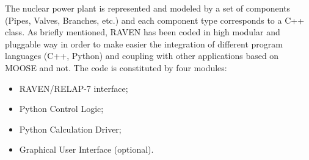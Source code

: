 \documentclass{mc2013}
\begin{document}
The nuclear power plant is represented and modeled by a set of components (Pipes, Valves, Branches, etc.) and each component type corresponds to a C++ class.
As briefly mentioned, RAVEN has been coded in high modular and pluggable way in order to make easier the integration of different program languages (C++, Python) and coupling with other applications based on MOOSE and not. The code is constituted by four modules:
\begin{itemize}
\item RAVEN/RELAP-7 interface;
\item Python Control Logic;
\item Python Calculation Driver;
\item Graphical User Interface (optional).
\end{itemize}
\end{document}
